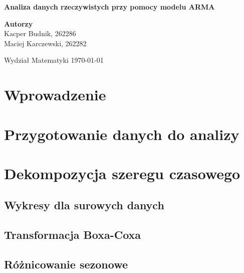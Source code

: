 \documentclass[12pt]{article}
\theoremstyle{exer}
\begin{document}
	\begin{titlepage}
		\begin{center}
			
			\textbf{\Huge  Analiza danych rzeczywistych przy pomocy modelu ARMA}
			
			\vspace{0.5cm}
			
			\vspace{1.5cm}
			
			\textbf{\LARGE Autorzy}\\
			\vspace{0.5cm}
			\large Kacper Budnik, 262286\\
			\large Maciej Karczewski, 262282\\
			
			
			\vfill
			
			\vspace{0.4cm}
			

			
			\vspace{0.8cm}
			Wydział Matematyki	
			\today
		\end{center}
	\end{titlepage}
	\tableofcontents
	\newpage
	
	\section{Wprowadzenie}
	
	\section{Przygotowanie danych do analizy}
	
	
	\section{Dekompozycja szeregu czasowego}
	\subsection{Wykresy dla surowych danych}
	
	\subsection{Transformacja Boxa-Coxa}

	\subsection{Różnicowanie sezonowe}
	
\end{document}
